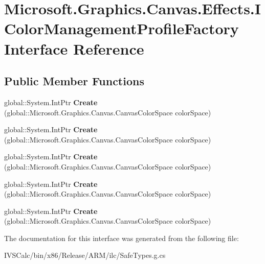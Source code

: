 \hypertarget{interface_microsoft_1_1_graphics_1_1_canvas_1_1_effects_1_1_i_color_management_profile_factory}{}\section{Microsoft.\+Graphics.\+Canvas.\+Effects.\+I\+Color\+Management\+Profile\+Factory Interface Reference}
\label{interface_microsoft_1_1_graphics_1_1_canvas_1_1_effects_1_1_i_color_management_profile_factory}
\subsection*{Public Member Functions}
\begin{DoxyCompactItemize}
\item 
\mbox{\label{interface_microsoft_1_1_graphics_1_1_canvas_1_1_effects_1_1_i_color_management_profile_factory_aed280f4d7b5f10f6b3819dfe440a2bf9}} 
global\+::\+System.\+Int\+Ptr {\bfseries Create} (global\+::\+Microsoft.\+Graphics.\+Canvas.\+Canvas\+Color\+Space color\+Space)
\item 
\mbox{\label{interface_microsoft_1_1_graphics_1_1_canvas_1_1_effects_1_1_i_color_management_profile_factory_aed280f4d7b5f10f6b3819dfe440a2bf9}} 
global\+::\+System.\+Int\+Ptr {\bfseries Create} (global\+::\+Microsoft.\+Graphics.\+Canvas.\+Canvas\+Color\+Space color\+Space)
\item 
\mbox{\label{interface_microsoft_1_1_graphics_1_1_canvas_1_1_effects_1_1_i_color_management_profile_factory_aed280f4d7b5f10f6b3819dfe440a2bf9}} 
global\+::\+System.\+Int\+Ptr {\bfseries Create} (global\+::\+Microsoft.\+Graphics.\+Canvas.\+Canvas\+Color\+Space color\+Space)
\item 
\mbox{\label{interface_microsoft_1_1_graphics_1_1_canvas_1_1_effects_1_1_i_color_management_profile_factory_aed280f4d7b5f10f6b3819dfe440a2bf9}} 
global\+::\+System.\+Int\+Ptr {\bfseries Create} (global\+::\+Microsoft.\+Graphics.\+Canvas.\+Canvas\+Color\+Space color\+Space)
\item 
\mbox{\label{interface_microsoft_1_1_graphics_1_1_canvas_1_1_effects_1_1_i_color_management_profile_factory_aed280f4d7b5f10f6b3819dfe440a2bf9}} 
global\+::\+System.\+Int\+Ptr {\bfseries Create} (global\+::\+Microsoft.\+Graphics.\+Canvas.\+Canvas\+Color\+Space color\+Space)
\end{DoxyCompactItemize}


The documentation for this interface was generated from the following file\+:\begin{DoxyCompactItemize}
\item 
I\+V\+S\+Calc/bin/x86/\+Release/\+A\+R\+M/ilc/Safe\+Types.\+g.\+cs\end{DoxyCompactItemize}
